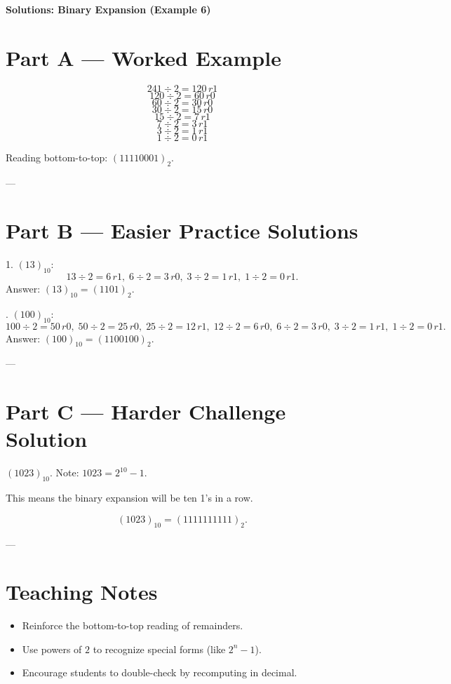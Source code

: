 \documentclass[12pt]{article}
\begin{document}
\begin{center}
\Large\textbf{Solutions: Binary Expansion (Example 6)}
\end{center}

\section*{Part A — Worked Example}
\[
241 \div 2 = 120 \, r1
\]
\[
120 \div 2 = 60 \, r0
\]
\[
60 \div 2 = 30 \, r0
\]
\[
30 \div 2 = 15 \, r0
\]
\[
15 \div 2 = 7 \, r1
\]
\[
7 \div 2 = 3 \, r1
\]
\[
3 \div 2 = 1 \, r1
\]
\[
1 \div 2 = 0 \, r1
\]

Reading bottom-to-top: $(11110001)_{2}$.

---

\section*{Part B — Easier Practice Solutions}

1. $(13)_{10}$:  
\[
13 \div 2 = 6 \, r1,\;
6 \div 2 = 3 \, r0,\;
3 \div 2 = 1 \, r1,\;
1 \div 2 = 0 \, r1.
\]  
Answer: $(13)_{10} = (1101)_{2}$.

. $(100)_{10}$:  
\[
100 \div 2 = 50 \, r0,\;
50 \div 2 = 25 \, r0,\;
25 \div 2 = 12 \, r1,\;
12 \div 2 = 6 \, r0,\;
6 \div 2 = 3 \, r0,\;
3 \div 2 = 1 \, r1,\;
1 \div 2 = 0 \, r1.
\]  
Answer: $(100)_{10} = (1100100)_{2}$.

---

\section*{Part C — Harder Challenge Solution}

$(1023)_{10}$. Note: $1023 = 2^{10} - 1$.

This means the binary expansion will be ten 1's in a row.

\[
(1023)_{10} = (1111111111)_{2}.
\]

---

\section*{Teaching Notes}
\begin{itemize}
  \item Reinforce the bottom-to-top reading of remainders.
  \item Use powers of $2$ to recognize special forms (like $2^n - 1$).
  \item Encourage students to double-check by recomputing in decimal.
\end{itemize}
\end{document}
